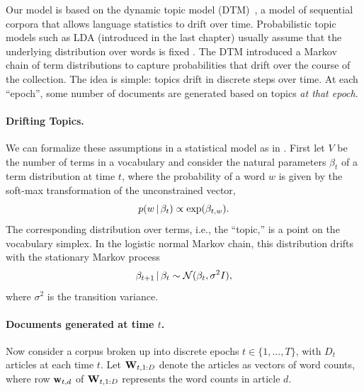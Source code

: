 Our model is based on the dynamic topic model (DTM)~\citep{blei:2006},
a model of sequential corpora that allows language statistics to drift
over time.  Probabilistic topic models such as LDA (introduced in the
last chapter) usually assume that the underlying distribution over
words is fixed \citep{blei:2003,deerwester:1990,hofmann:1999}. The DTM
introduced a Markov chain of term distributions to capture
probabilities that drift over the course of the collection.  The idea
is simple: topics drift in discrete steps over time.  At each
``epoch'', some number of documents are generated based on topics
\emph{at that epoch}.

\paragraph{Drifting Topics.} We can formalize these assumptions in a
statistical model as in \cite{blei:2006}.  First let
$V$ be the number of terms in a vocabulary and consider the natural
parameters $\beta_t$ of a term distribution at time $t$, where the
probability of a word $w$ is given by the soft-max transformation of
the unconstrained vector,
\begin{equation}
  \label{eq:softmax}
  p(w \, | \, \beta_{t}) \propto \exp(\beta_{t,w}).
\end{equation}
The corresponding distribution over terms, i.e., the ``topic,'' is a
point on the vocabulary simplex.  In the logistic normal Markov chain,
this distribution drifts with the stationary Markov process
\begin{equation}
  \label{eq:logistic-normal}
  \beta_{t+1} \, | \, \beta_t \sim \mathcal{N}(\beta_{t}, \sigma^2 I),
\end{equation}
where $\sigma^2$ is the transition variance. 

\paragraph{Documents generated at time $t$.} Now consider a corpus
broken up into discrete epochs $t \in \{ 1, \ldots, T \}$, with $D_t$
articles at each time $t$.  Let $\textbf{W}_{t,1:D}$ denote the articles as
vectors of word counts, where row $\textbf{w}_{t,d}$ of $\textbf{W}_{t, 1:D}$
represents the word counts in article $d$.


